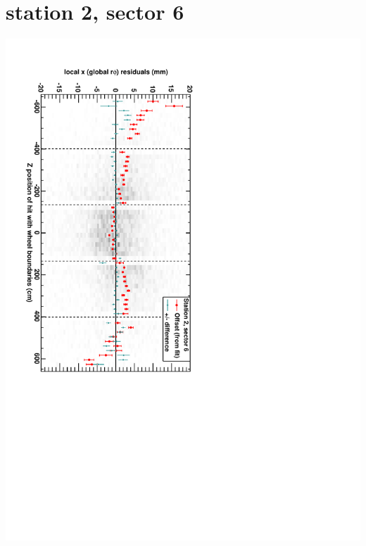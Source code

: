 \documentclass[compress]{beamer}
\begin{document}
\section*{station 2, sector 6}
\begin{frame} \vfill \mbox{\hspace{-1 cm}\includegraphics[height=1.2\linewidth, angle=90]{DTrphiVsZ_st2_sr06.pdf}} \end{frame}
\end{document}
